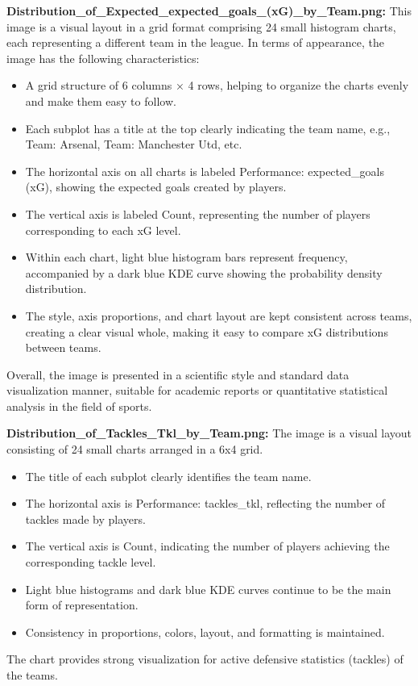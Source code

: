 \documentclass[12pt]{report}
\begin{document}
{{\textbf{Distribution\_of\_Expected\_expected\_goals\_(xG)\_by\_Team.png:} %
This image is a visual layout in a grid format comprising 24 small histogram charts, each representing a different team in the league. In terms of appearance, the image has the following characteristics:
\begin{itemize}
	\item A grid structure of 6 columns × 4 rows, helping to organize the charts evenly and make them easy to follow.
	\item Each subplot has a title at the top clearly indicating the team name, e.g., Team: Arsenal, Team: Manchester Utd, etc.
	\item The horizontal axis on all charts is labeled Performance: expected\_goals (xG), showing the expected goals created by players.
	\item The vertical axis is labeled Count, representing the number of players corresponding to each xG level.
	\item Within each chart, light blue histogram bars represent frequency, accompanied by a dark blue KDE curve showing the probability density distribution.
	\item The style, axis proportions, and chart layout are kept consistent across teams, creating a clear visual whole, making it easy to compare xG distributions between teams.
\end{itemize}
Overall, the image is presented in a scientific style and standard data visualization manner, suitable for academic reports or quantitative statistical analysis in the field of sports.

\textbf{Distribution\_of\_Tackles\_Tkl\_by\_Team.png:} %
The image is a visual layout consisting of 24 small charts arranged in a 6x4 grid.
\begin{itemize}
	\item The title of each subplot clearly identifies the team name.
	\item The horizontal axis is Performance: tackles\_tkl, reflecting the number of tackles made by players.
	\item The vertical axis is Count, indicating the number of players achieving the corresponding tackle level.
	\item Light blue histograms and dark blue KDE curves continue to be the main form of representation.
	\item Consistency in proportions, colors, layout, and formatting is maintained.
\end{itemize}
The chart provides strong visualization for active defensive statistics (tackles) of the teams.

}}
\end{document}
